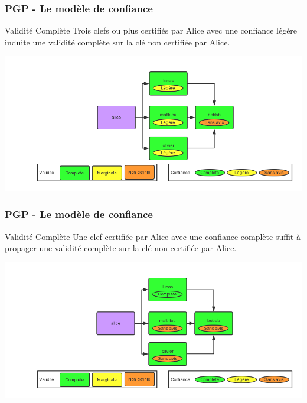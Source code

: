 \begin{frame}
  \frametitle{\color{white}PGP - Le modèle de confiance}
    \begin{block}{Validité Complète}
      Trois clefs ou plus certifiés par Alice avec une confiance légère
      induite une validité complète sur la clé non certifiée par Alice.
    \end{block}
    \includegraphics[scale=0.3]{tdcdemoComplete1.png}
\end{frame}
\begin{frame}
  \frametitle{\color{white}PGP - Le modèle de confiance}
    \begin{block}{Validité Complète}
      Une clef certifiée par Alice avec une confiance complète
      suffit à propager une validité complète sur la clé non certifiée par Alice.
    \end{block}
    \includegraphics[scale=0.3]{tdcdemoComplete2.png}
\end{frame}

